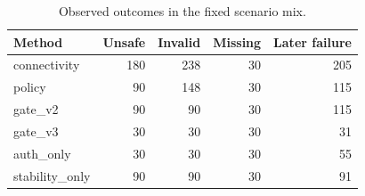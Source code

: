 \begin{table}[t]
\centering
\caption{Observed outcomes in the fixed scenario mix.}
\label{tab:stage4}
\begin{tabular}{lrrrr}
\hline
Method & Unsafe & Invalid & Missing & Later failure \\
\hline
connectivity & 180 & 238 & 30 & 205 \\
policy & 90 & 148 & 30 & 115 \\
gate\_v2 & 90 & 90 & 30 & 115 \\
gate\_v3 & 30 & 30 & 30 & 31 \\
auth\_only & 30 & 30 & 30 & 55 \\
stability\_only & 90 & 90 & 30 & 91 \\
\hline
\end{tabular}
\end{table}
